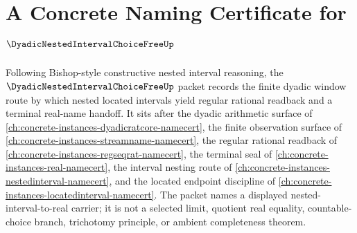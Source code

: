 \chapter{A Concrete Naming Certificate for $\DyadicNestedIntervalChoiceFreeUp$}
\label{ch:concrete-instances-dyadic-nested-interval-choice-free-namecert}

Following Bishop-style constructive nested interval reasoning, the $\DyadicNestedIntervalChoiceFreeUp$ packet records the finite dyadic window route by which nested located intervals yield regular rational readback and a terminal real-name handoff. It sits after the dyadic arithmetic surface of \autoref{ch:concrete-instances-dyadicratcore-namecert}, the finite observation surface of \autoref{ch:concrete-instances-streamname-namecert}, the regular rational readback of \autoref{ch:concrete-instances-regseqrat-namecert}, the terminal seal of \autoref{ch:concrete-instances-real-namecert}, the interval nesting route of \autoref{ch:concrete-instances-nestedinterval-namecert}, and the located endpoint discipline of \autoref{ch:concrete-instances-locatedinterval-namecert}. The packet names a displayed nested-interval-to-real carrier; it is not a selected limit, quotient real equality, countable-choice branch, trichotomy principle, or ambient completeness theorem.

